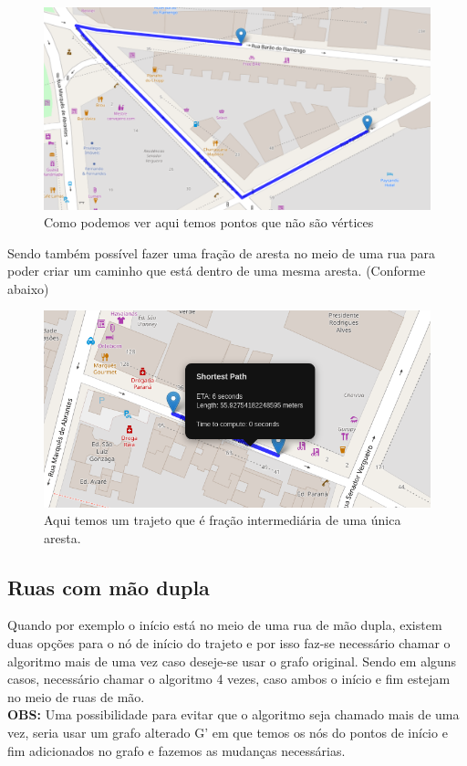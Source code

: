 \documentclass{article}
\begin{document}
\begin{figure}[H]
    \centering
    \includegraphics[scale=0.43]{EDA_fraction_edge.png}
    \caption{Como podemos ver aqui temos pontos que não são vértices}
    \label{fig5}
\end{figure}

Sendo também possível fazer uma fração de aresta no meio de uma rua para poder criar um caminho que está dentro de uma mesma aresta. (Conforme abaixo)

\begin{figure}[H]
    \centering
    \includegraphics[scale=0.7]{EDA_same_street_special_case.png}
    \caption{Aqui temos um trajeto que é fração intermediária de uma única aresta.}
    \label{fig6}
\end{figure}

\subsection{Ruas com mão dupla}
Quando por exemplo o início está no meio de uma rua de mão dupla, existem duas opções para o nó de início do trajeto e por isso faz-se necessário chamar o algoritmo mais de uma vez caso deseje-se usar o grafo original. Sendo em alguns casos, necessário chamar o algoritmo 4 vezes, caso ambos o início e fim estejam no meio de ruas de mão.\\
\textbf{OBS:} Uma possibilidade para evitar que o algoritmo seja chamado mais de uma vez, seria usar um grafo alterado G' em que temos os nós do pontos de início e fim adicionados no grafo e fazemos as mudanças necessárias.\\
\end{document}
